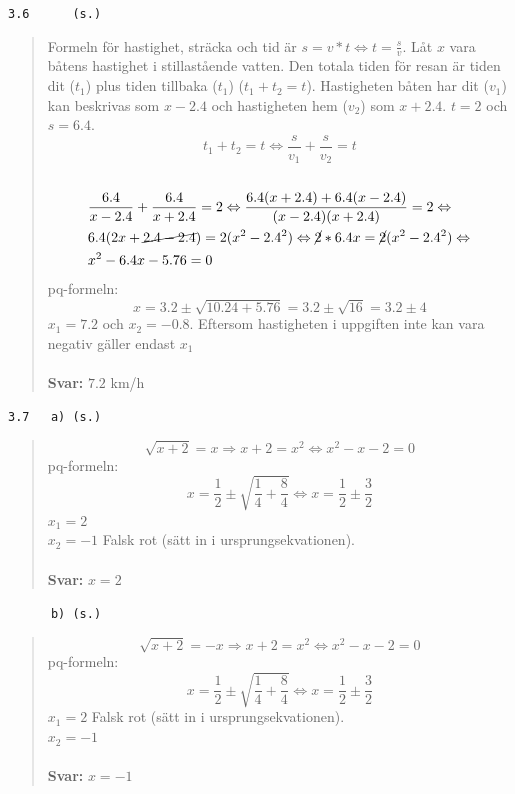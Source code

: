 \documentclass[a4paper]{article}
\newcommand{\tskcol}[1]{\textcolor{tskcol}{#1}}
\begin{document}
	\texttt{\tskcol{3.6~~~~~ (s.)}}
	\begin{quotation}
		\noindent
		Formeln för hastighet, sträcka och tid är $s=v*t \Leftrightarrow t=\frac{s}{v}$. Låt $x$ vara båtens hastighet i stillastående vatten. Den totala tiden för resan är tiden dit ($t_1$) plus tiden tillbaka ($t_1$) ($t_1+t_2=t$).
		Hastigheten båten har dit ($v_1$) kan beskrivas som $x-2.4$ och hastigheten hem ($v_2$) som $x+2.4$. $t=2$ och $s=6.4$.
		\[t_1+t_2=t\Leftrightarrow
		\frac{s}{v_1}+\frac{s}{v_2}=t\] \\
		\begin{align*}
		&\frac{6.4}{x-2.4}+\frac{6.4}{x+2.4} = 2 \Leftrightarrow
		\frac{6.4(x+2.4)+6.4(x-2.4)}{(x-2.4)(x+2.4)} = 2 \Leftrightarrow \\
		&6.4(2x+\cancel{2.4-2.4})=2(x^2-2.4^2) \Leftrightarrow
		\cancel{2}*6.4x=\cancel{2}(x^2-2.4^2) \Leftrightarrow \\
		&x^2-6.4x-5.76=0
		\end{align*}
		pq-formeln:
		\[x=3.2\pm\sqrt{10.24+5.76} =3.2\pm\sqrt{16}=3.2\pm 4\]
		$x_1=7.2$ och $x_2=-0.8$. Eftersom hastigheten i uppgiften inte kan vara negativ gäller endast $x_1$
		\\ \\
		\textbf{Svar:} $7.2$ km/h 
	\end{quotation}
	
	\texttt{\tskcol{3.7~~~a) (s.)}}
	\begin{quotation}
		\noindent
		\[\sqrt{x+2}=x \Rightarrow
		x+2=x^2 \Leftrightarrow
		x^2-x-2=0 \]
		pq-formeln: \\
		\[x=\frac{1}{2}\pm\sqrt{\frac{1}{4}+\frac{8}{4}} \Leftrightarrow
		x=\frac{1}{2}\pm\frac{3}{2}\]
		$x_1=2$ \\
		$x_2=-1$ Falsk rot (sätt in i ursprungsekvationen).
		\\ \\
		\textbf{Svar:} $x=2$
	\end{quotation}
	
	\texttt{\tskcol{~~~~~~b) (s.)}}
	\begin{quotation}
		\noindent
		\[\sqrt{x+2}=-x \Rightarrow
		x+2=x^2 \Leftrightarrow
		x^2-x-2=0\]
		pq-formeln: \\
		\[x=\frac{1}{2}\pm\sqrt{\frac{1}{4}+\frac{8}{4}} \Leftrightarrow
		x=\frac{1}{2}\pm\frac{3}{2}\]
		$x_1=2$ Falsk rot (sätt in i ursprungsekvationen). \\
		$x_2=-1$
		\\ \\
		\textbf{Svar:} $x=-1$
	\end{quotation}
	
\end{document}
